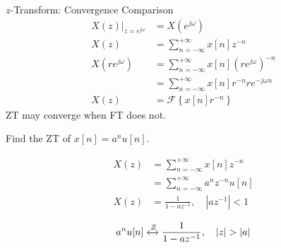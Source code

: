 \begin{frame}{$z$-Transform: Convergence Comparison}
    \begin{align*}
        \left.X(z)\right|_{z=e^{j\omega}} &= X(e^{j\omega})\\
        X(z) &= \sum_{n=-\infty}^{+\infty}x[n]z^{-n}\\
        X(re^{j\omega}) &= \sum_{n=-\infty}^{+\infty}x[n]\left(re^{j\omega}\right)^{-n}\\
        &= \sum_{n=-\infty}^{+\infty}x[n]r^{-n}re^{-j\omega n}\\
        X(z) &= \mathcal{F}\left\{ x[n]r^{-n}\right\}
    \end{align*}
    {
        ZT may converge when FT does not.
    }
\end{frame}

\begin{frame}[t]{}
    \begin{example}
        Find the ZT of
        $
            x[n] = a^nu[n].
        $
    \end{example}

    {
            \begin{align*}
                X(z) &= \sum_{n=-\infty}^{+\infty}x[n]z^{-n}\\
                &= \sum_{n=-\infty}^{+\infty}a^nz^{-n}u[n]\\
                X(z) &= \frac{1}{1-az^{-1}}, \quad |az^{-1}|< 1\\
            \end{align*}\pause
            \begin{equation*}
                a^nu[n] \xleftrightarrow{\mathcal{Z}}   \frac{1}{1-az^{-1}}, \quad |z|> |a|
            \end{equation*}
    }
\end{frame}





